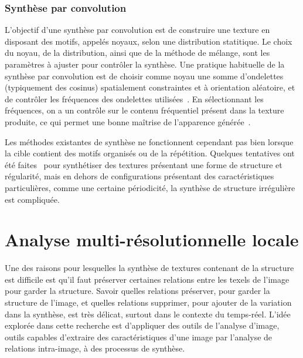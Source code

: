 \subsubsection{Synthèse par convolution}

L'objectif d'une synthèse par convolution est de construire une texture en disposant des motifs, appelés noyaux, selon une distribution statitique. Le choix du noyau, de la distribution, ainsi que de la méthode de mélange, sont les paramètres à ajuster pour contrôler la synthèse. Une pratique habituelle de la synthèse par convolution est de choisir comme noyau une somme d'ondelettes (typiquement des cosinus) spatialement constraintes et à orientation aléatoire, et de contrôler les fréquences des ondelettes utilisées~\cite{tricard_procedural_2019}. En sélectionnant les fréquences, on a un contrôle sur le contenu fréquentiel présent dans la texture produite, ce qui permet une bonne maîtrise de l'apparence générée~\cite{gilet_local_2014}.

\bigskip

Les méthodes existantes de synthèse ne fonctionnent cependant pas bien lorsque la cible contient des motifs organisés ou de la répétition. Quelques tentatives ont été faites~\cite{lutz_cyclostationary-gaussian_2021} pour synthétiser des textures présentant une forme de structure et régularité, mais en dehors de configurations présentant des caractéristiques particulières, comme une certaine périodicité, la synthèse de structure irrégulière est compliquée.



\section{Analyse multi-résolutionnelle locale}

Une des raisons pour lesquelles la synthèse de textures contenant de la structure est difficile est qu'il faut préserver certaines relations entre les texels de l'image pour garder la structure. Savoir quelles relations préserver, pour garder la structure de l'image, et quelles relations supprimer, pour ajouter de la variation dans la synthèse, est très délicat, surtout dans le contexte du temps-réel. L'idée explorée dans cette recherche est d'appliquer des outils de l'analyse d'image, outils capables d'extraire des caractéristiques d'une image par l'analyse de relations intra-image, à des processus de synthèse.

